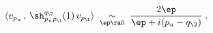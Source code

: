 \begin{equation}
\langle  v_{p_u}\, ,\, \sh_{p_u p_\1}^{q_\2}(1)\,
v_{p_\1} \rangle\;\underset{\ep\ra 0}{\sim}\;
\frac{2\ep}{\ep+i(p_u-q_\2)}\;.
\end{equation}

